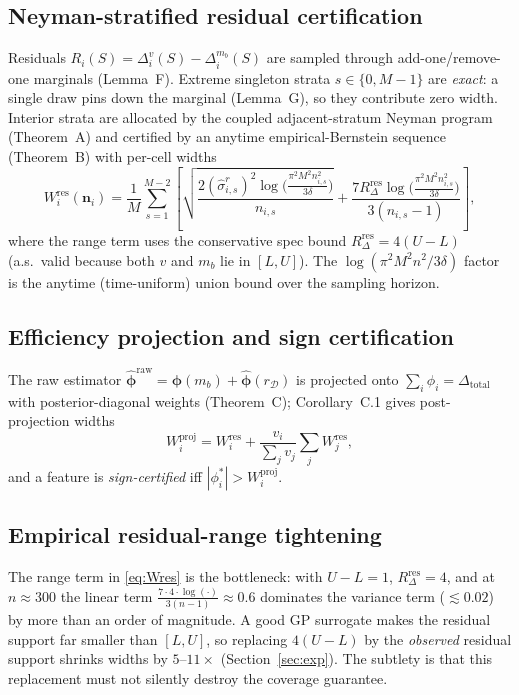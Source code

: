 \documentclass[11pt,twocolumn]{article}
\begin{document}
\subsection{Neyman-stratified residual certification}\label{sec:cert}
Residuals $R_i(S)=\Delta_i^v(S)-\Delta_i^{m_b}(S)$ are sampled through
add-one/remove-one marginals (Lemma~F).  Extreme singleton strata
$s\in\{0,M-1\}$ are \emph{exact}: a single draw pins down the marginal
(Lemma~G), so they contribute zero width.  Interior strata are allocated by
the coupled adjacent-stratum Neyman program (Theorem~A) and certified by an
anytime empirical-Bernstein sequence (Theorem~B) with per-cell widths
\begin{equation}
W_i^{\mathrm{res}}(\mathbf{n}_i)=\frac1M\sum_{s=1}^{M-2}
\left[\sqrt{\frac{2(\hat\sigma_{i,s}^r)^2
\log\!\big(\frac{\pi^2 M^2 n_{i,s}^2}{3\delta}\big)}{n_{i,s}}}
+\frac{7 R_\Delta^{\mathrm{res}}
\log\!\big(\frac{\pi^2 M^2 n_{i,s}^2}{3\delta}\big)}{3(n_{i,s}-1)}\right],
\label{eq:Wres}
\end{equation}
where the range term uses the conservative spec bound
$R_\Delta^{\mathrm{res}}=4(U-L)$ (a.s.\ valid because both $v$ and $m_b$ lie
in $[L,U]$).  The $\log(\pi^2 M^2 n^2/3\delta)$ factor is the anytime
(time-uniform) union bound over the sampling horizon.

\subsection{Efficiency projection and sign certification}\label{sec:proj}
The raw estimator $\hat{\boldsymbol{\phi}}^{\mathrm{raw}}=
\boldsymbol{\phi}(m_b)+\hat{\boldsymbol{\phi}}(r_{\mathcal{D}})$ is projected
onto $\sum_i\phi_i=\Delta_{\mathrm{total}}$ with posterior-diagonal weights
(Theorem~C); Corollary~C.1 gives post-projection widths
\begin{equation}
W_i^{\mathrm{proj}}=W_i^{\mathrm{res}}+
\frac{v_i}{\sum_j v_j}\sum_j W_j^{\mathrm{res}},
\label{eq:proj}
\end{equation}
and a feature is \emph{sign-certified} iff $|\phi_i^*|>W_i^{\mathrm{proj}}$.

\subsection{Empirical residual-range tightening}\label{sec:tight}
The range term in \eqref{eq:Wres} is the bottleneck: with $U-L=1$,
$R_\Delta^{\mathrm{res}}=4$, and at $n\approx300$ the linear term
$\frac{7\cdot4\cdot\log(\cdot)}{3(n-1)}\approx0.6$ dominates the variance
term ($\lesssim0.02$) by more than an order of magnitude.  A good GP
surrogate makes the residual support far smaller than $[L,U]$, so replacing
$4(U-L)$ by the \emph{observed} residual support shrinks widths by
$5$--$11\times$ (Section~\ref{sec:exp}).  The subtlety is that this
replacement must not silently destroy the coverage guarantee.
\end{document}
